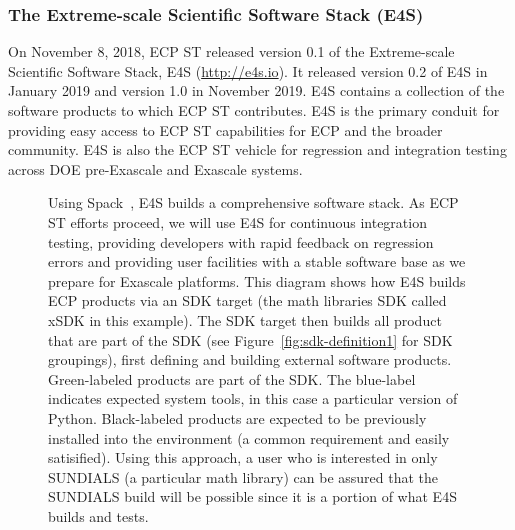 \subsubsection{The Extreme-scale Scientific Software Stack (E4S)}\label{subsubsect:e4s}
On November 8, 2018, ECP ST released version 0.1 of the Extreme-scale Scientific Software Stack, E4S (\url{http://e4s.io}). It released version 0.2 of E4S in January 2019 and version 1.0 in November 2019. E4S contains a collection of the software products to which ECP ST contributes.  E4S is the primary conduit for providing easy access to ECP ST capabilities for ECP and the broader community.  E4S is also the ECP ST vehicle for regression and integration testing across DOE pre-Exascale and Exascale systems.

\begin{figure}
		\centering
	\caption{Using Spack~\cite{gamblin+:ecp18-spack-tutorial}, E4S builds a comprehensive software stack.  As ECP ST efforts proceed, we will use E4S for continuous integration testing, providing developers with rapid feedback on regression errors and providing user facilities with a stable software base as we prepare for Exascale platforms.  This diagram shows how E4S builds ECP products via an SDK target (the math libraries SDK called xSDK in this example).  The SDK target then builds all product that are part of the SDK (see Figure~\ref{fig:sdk-definition1} for SDK groupings), first defining and building external software products. Green-labeled products are part of the SDK. The blue-label indicates expected system tools, in this case a particular version of Python.  Black-labeled products are expected to be previously installed into the environment (a common requirement and easily satisified).  Using this approach, a user who is interested in only SUNDIALS (a particular math library) can be assured that the SUNDIALS build will be possible since it is a portion of what E4S builds and tests.}
	\label{fig:e4s-build-tree}
\end{figure}

